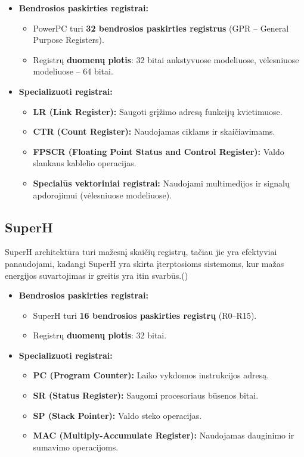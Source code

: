 \documentclass{article}
\begin{document}
\begin{itemize}
    \item \textbf{Bendrosios paskirties registrai:} 
        \begin{itemize}
            \item PowerPC turi \textbf{32 bendrosios paskirties registrus} (GPR – General Purpose Registers).
            \item Registrų \textbf{duomenų plotis}: 32 bitai ankstyvuose modeliuose, vėlesniuose modeliuose – 64 bitai.
        \end{itemize}
    \item \textbf{Specializuoti registrai:}
        \begin{itemize}
            \item \textbf{LR (Link Register):} Saugoti grįžimo adresą funkcijų kvietimuose.
            \item \textbf{CTR (Count Register):} Naudojamas ciklams ir skaičiavimams.
            \item \textbf{FPSCR (Floating Point Status and Control Register):} Valdo slankaus kablelio operacijas.
            \item \textbf{Specialūs vektoriniai registrai:} Naudojami multimedijos ir signalų apdorojimui (vėlesniuose modeliuose).
        \end{itemize}
\end{itemize}

\subsection{SuperH}
SuperH architektūra turi mažesnį skaičių registrų, tačiau jie yra efektyviai panaudojami, kadangi SuperH yra skirta įterptosioms sistemoms, kur mažas energijos suvartojimas ir greitis yra itin svarbūs.(\citealp{Renesas2024})

\begin{itemize}
    \item \textbf{Bendrosios paskirties registrai:}
        \begin{itemize}
            \item SuperH turi \textbf{16 bendrosios paskirties registrų} (R0–R15).
            \item Registrų \textbf{duomenų plotis}: 32 bitai.
        \end{itemize}
    \item \textbf{Specializuoti registrai:}
        \begin{itemize}
            \item \textbf{PC (Program Counter):} Laiko vykdomos instrukcijos adresą.
            \item \textbf{SR (Status Register):} Saugomi procesoriaus būsenos bitai.
            \item \textbf{SP (Stack Pointer):} Valdo steko operacijas.
            \item \textbf{MAC (Multiply-Accumulate Register):} Naudojamas dauginimo ir sumavimo operacijoms.
        \end{itemize}
\end{itemize}
\end{document}
